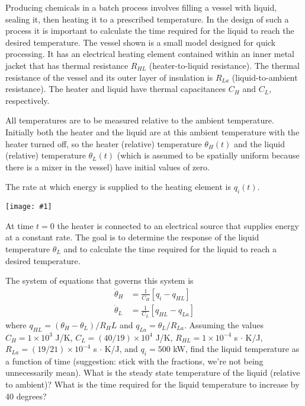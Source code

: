 \documentclass[12pt,letterpaper]{hmcpset}
\newcommand{\diagram}[2]{\begin{center}\texttt{[image: \#1]}\end{center}}
\begin{document}
	
	\afterpage{\null\newpage}
	
	
	\begin{problem}[2]
		\setlength{\parskip}{3pt}
		Producing chemicals in a batch process involves filling a vessel with liquid, sealing it, then
		heating it to a prescribed temperature. In the design of such a process it is important to
		calculate the time required for the liquid to reach the desired temperature. The vessel shown
		is a small model designed for quick processing. It has an electrical heating element contained
		within an inner metal jacket that has thermal resistance $R_{HL}$ (heater-to-liquid resistance).
		The thermal resistance of the vessel and its outer layer of insulation is $R_{La}$ (liquid-to-ambient
		resistance). The heater and liquid have thermal capacitances $C_H$ and $C_L$, respectively.
		
		All temperatures are to be measured relative to the ambient temperature. Initially both the
		heater and the liquid are at this ambient temperature with the heater turned off, so the heater
		(relative) temperature $\theta_H (t)$ and the liquid (relative) temperature $\theta_L (t)$ (which is assumed to
		be spatially uniform because there is a mixer in the vessel) have initial values of zero.
		
		The rate at which energy is supplied to the heating element is $q_i (t)$.
		
		\diagram{Heater}{2}
		
		At time $t = 0$ the heater is connected to an electrical source that supplies energy at a constant
		rate. The goal is to determine the response of the liquid temperature $\theta_L$ and to calculate the
		time required for the liquid to reach a desired temperature.
		
		The system of equations that governs this system is
		\begin{displaymath}
		\begin{split}
		\Dot{\theta}_H &= \frac{1}{C_H} \left[ q_i - q_{HL} \right]\\
		\Dot{\theta}_L &= \frac{1}{C_L} \left[ q_{HL} - q_{La} \right]
		\end{split} 
		\end{displaymath}
		where $q_{HL} = (\theta_H - \theta_L)/R_HL$ and $q_{La} = \theta_L / R_{La}$. Assuming the values 
		$C_H = 1 \times 10^3$ J/K,
		$C_L = (40/19) \times 10^4$ J/K,
		$R_{HL} = 1 \times 10^{-4}$	s $\cdot$ K/J, 
		$R_{La} = (19/21) × 10^{-4}$ s $\cdot$ K/J, and
		$q_i = 500$ kW, 
		find the liquid temperature as a function of time (suggestion: stick with the
		fractions, we're not being unnecessarily mean). What is the steady state temperature of the
		liquid (relative to ambient)? What is the time required for the liquid temperature to increase
		by 40 degrees?
	\end{problem}
	
\end{document}
